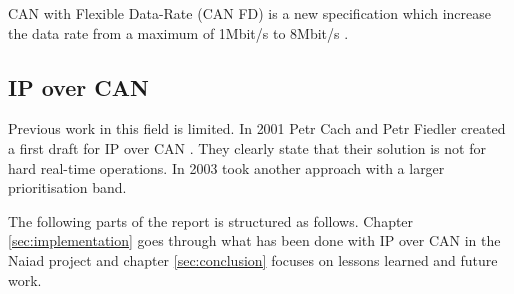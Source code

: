 CAN with Flexible Data-Rate (CAN FD) is a new specification which increase the
data rate from a maximum of 1Mbit/s to 8Mbit/s \cite{standard:can_bus_fd}.

\subsection{IP over CAN}
Previous work in this field is limited. In 2001 Petr Cach and Petr Fiedler
created a first draft for IP over CAN \cite{web:draft-ip_over_can}. They
clearly state that their solution is not for hard real-time operations. In
2003 \cite{web:porting_ip_can} took another approach with a larger prioritisation
band.

The following parts of the report is structured as follows. Chapter \ref{sec:implementation}
goes through what has been done with IP over CAN in the Naiad project and chapter
\ref{sec:conclusion} focuses on lessons learned and future work.
